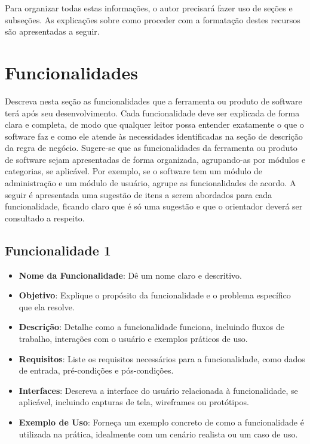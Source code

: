 Para organizar todas estas informações, o autor precisará fazer uso de seções e subseções. As explicações sobre como proceder com a formatação destes recursos são apresentadas a seguir.

\section{Funcionalidades}

Descreva nesta seção as funcionalidades que a ferramenta ou produto de software terá após seu desenvolvimento. Cada funcionalidade deve ser explicada de forma clara e completa, de modo que qualquer leitor possa entender exatamente o que o software faz e como ele atende às necessidades identificadas na seção de descrição da regra de negócio.
Sugere-se que as funcionalidades da ferramenta ou produto de software sejam apresentadas de forma organizada, agrupando-as por módulos e categorias, se aplicável. Por exemplo, se o software tem um módulo de administração e um módulo de usuário, agrupe as funcionalidades de acordo. A seguir é apresentada uma sugestão de itens a serem abordados para cada funcionalidade, ficando claro que é só uma sugestão e que o orientador deverá ser consultado a respeito.

\subsection{Funcionalidade 1}
\begin{itemize}
    \item \textbf{Nome da Funcionalidade}: Dê um nome claro e descritivo.
    \item \textbf{Objetivo}: Explique o propósito da funcionalidade e o problema específico que ela resolve.
    \item \textbf{Descrição}: Detalhe como a funcionalidade funciona, incluindo fluxos de trabalho, interações com o usuário e exemplos práticos de uso.
    \item \textbf{Requisitos}: Liste os requisitos necessários para a funcionalidade, como dados de entrada, pré-condições e pós-condições.
    \item \textbf{Interfaces}: Descreva a interface do usuário relacionada à funcionalidade, se aplicável, incluindo capturas de tela, wireframes ou protótipos.
    \item \textbf{Exemplo de Uso}: Forneça um exemplo concreto de como a funcionalidade é utilizada na prática, idealmente com um cenário realista ou um caso de uso.
\end{itemize}

